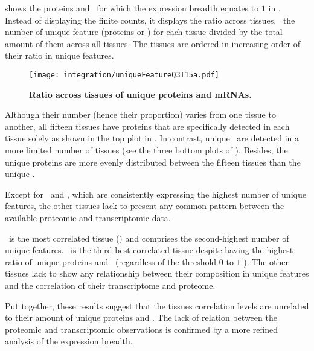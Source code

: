  shows the proteins and \mRNAs\
for which the expression breadth equates to $1$ in .
Instead of displaying the finite counts,
it displays the ratio across tissues,
\ie\ the number of unique feature (proteins or \mRNAs)
for each tissue divided by the total amount of them across all tissues.
The tissues are ordered in increasing order of their ratio in unique features.

\begin{figure}[!htb]
    \texttt{[image: integration/uniqueFeatureQ3T15a.pdf]}\centering
    \vspace{-3mm}
    \caption[Ratio across tissues of unique proteins and mRNAs]{\label{fig:UniqueFeatureQ3T15}
    \textbf{Ratio across tissues of unique proteins and mRNAs.}
    }
\end{figure}

Although their number (hence their proportion) varies from one tissue to another,
all fifteen tissues have proteins
that are specifically detected in each tissue solely
as shown in the top plot in .
In contrast, unique \mRNAs\ are detected in a more limited number of tissues
(see the three bottom plots of \Cref{fig:UniqueFeatureQ3T15}).
Besides, the unique proteins are more evenly distributed
between the fifteen tissues than the unique \mRNAs.

Except for \Testis\ and \Liver,
which are consistently expressing the highest number of unique features,
the other tissues lack to present any common pattern
between the available proteomic and transcriptomic data.

\Liver\ is the most correlated tissue ()
and comprises the second-highest number of unique features.
\Testis\ is the third-best correlated tissue
despite having the highest ratio of unique proteins and \mRNAs\
(regardless of the threshold $0$ to $1$ \FPKM).
The other tissues lack to show any relationship
between their composition in unique features
and the correlation of their transcriptome and proteome.

Put together, these results suggest that
the tissues correlation levels are unrelated
to their amount of unique proteins and \mRNAs{}.
The lack of relation between the proteomic and transcriptomic observations
is confirmed by a more refined analysis of the expression breadth.

